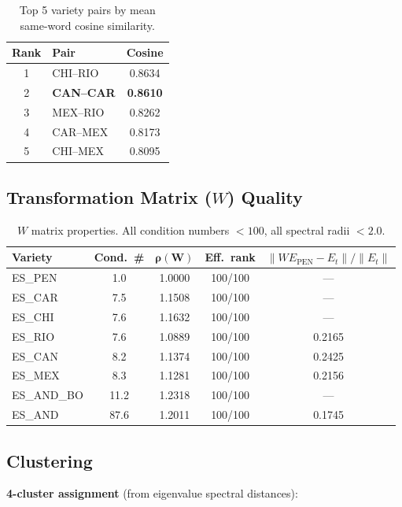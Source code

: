 \documentclass[11pt,a4paper]{article}
\begin{document}
\begin{table}[H]
\centering
\begin{tabular}{@{}clc@{}}
\toprule
\textbf{Rank} & \textbf{Pair} & \textbf{Cosine} \\
\midrule
1 & CHI--RIO & 0.8634 \\
\rowcolor{green!12}
2 & \textbf{CAN--CAR} & \textbf{0.8610} \\
3 & MEX--RIO & 0.8262 \\
4 & CAR--MEX & 0.8173 \\
5 & CHI--MEX & 0.8095 \\
\bottomrule
\end{tabular}
\caption{Top 5 variety pairs by mean same-word cosine similarity.}
\end{table}

\subsection{Transformation Matrix ($W$) Quality}

\begin{table}[H]
\centering
\begin{tabular}{@{}lcccc@{}}
\toprule
\textbf{Variety} & \textbf{Cond.\ \#} & $\boldsymbol{\rho(W)}$ & \textbf{Eff.\ rank} & $\|W E_{\text{PEN}} - E_t\|/\|E_t\|$ \\
\midrule
ES\_PEN & 1.0 & 1.0000 & 100/100 & --- \\
ES\_CAR & 7.5 & 1.1508 & 100/100 & --- \\
ES\_CHI & 7.6 & 1.1632 & 100/100 & --- \\
ES\_RIO & 7.6 & 1.0889 & 100/100 & 0.2165 \\
ES\_CAN & 8.2 & 1.1374 & 100/100 & 0.2425 \\
ES\_MEX & 8.3 & 1.1281 & 100/100 & 0.2156 \\
ES\_AND\_BO & 11.2 & 1.2318 & 100/100 & --- \\
ES\_AND & 87.6 & 1.2011 & 100/100 & 0.1745 \\
\bottomrule
\end{tabular}
\caption{$W$ matrix properties. All condition numbers $< 100$, all spectral radii $< 2.0$.}
\label{tab:W}
\end{table}

\subsection{Clustering}

\textbf{4-cluster assignment} (from eigenvalue spectral distances):
\end{document}

